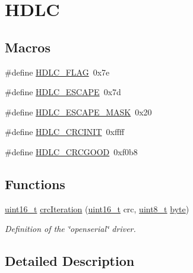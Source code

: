 \hypertarget{group___h_d_l_c}{}\section{H\+D\+LC}
\label{group___h_d_l_c}
\subsection*{Macros}
\begin{DoxyCompactItemize}
\item 
\#define \hyperlink{group___h_d_l_c_ga7dfaac00ac4dc67fd47f2cbdf51d5c72}{H\+D\+L\+C\+\_\+\+F\+L\+AG}~0x7e
\item 
\#define \hyperlink{group___h_d_l_c_ga8a4ca60e37719a6f32b08305b1fd8db0}{H\+D\+L\+C\+\_\+\+E\+S\+C\+A\+PE}~0x7d
\item 
\#define \hyperlink{group___h_d_l_c_ga58f1283be0ca42b536f5ea4ad3b2a3f3}{H\+D\+L\+C\+\_\+\+E\+S\+C\+A\+P\+E\+\_\+\+M\+A\+SK}~0x20
\item 
\#define \hyperlink{group___h_d_l_c_gac6338106c1e01eed6ade73fe14f318ed}{H\+D\+L\+C\+\_\+\+C\+R\+C\+I\+N\+IT}~0xffff
\item 
\#define \hyperlink{group___h_d_l_c_gaa5c49016c845b86719f3cf78b851bb11}{H\+D\+L\+C\+\_\+\+C\+R\+C\+G\+O\+OD}~0xf0b8
\end{DoxyCompactItemize}
\subsection*{Functions}
\begin{DoxyCompactItemize}
\item 
\hyperlink{_p_e___types_8h_a1f1825b69244eb3ad2c7165ddc99c956}{uint16\+\_\+t} \hyperlink{group___h_d_l_c_ga8372825eda50d108878ed5c5a9b84ab0}{crc\+Iteration} (\hyperlink{_p_e___types_8h_a1f1825b69244eb3ad2c7165ddc99c956}{uint16\+\_\+t} crc, \hyperlink{_p_e___types_8h_aba7bc1797add20fe3efdf37ced1182c5}{uint8\+\_\+t} \hyperlink{_p_e___types_8h_a0c8186d9b9b7880309c27230bbb5e69d}{byte})
\begin{DoxyCompactList}\small\item\em Definition of the \char`\"{}openserial\char`\"{} driver. \end{DoxyCompactList}\end{DoxyCompactItemize}


\subsection{Detailed Description}


